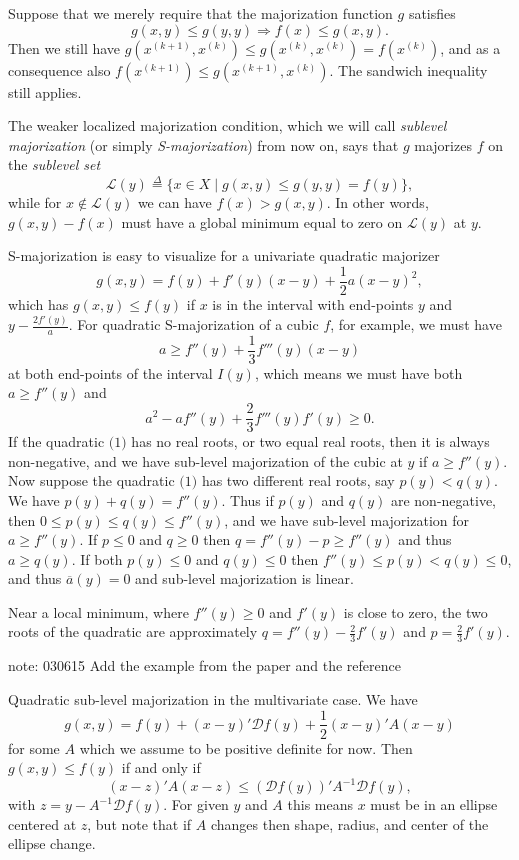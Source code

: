 \documentclass[
  12pt,
]{book}
\begin{document}
Suppose that we merely require that the majorization function \(g\) satisfies
\[
g(x,y)\leq g(y,y)\Rightarrow f(x)\leq g(x,y).
\]
Then we still have \(g(x^{(k+1)},x^{(k)})\leq g(x^{(k)},x^{(k)})=f(x^{(k)})\), and as a consequence also \(f(x^{(k+1)})\leq g(x^{(k+1)},x^{(k)})\). The sandwich inequality still applies.

The weaker localized majorization condition, which we will call \emph{sublevel majorization} (or simply \emph{S-majorization}) from now on,
says that \(g\) majorizes \(f\) on the \emph{sublevel set}
\[
\mathcal{L}(y)\mathop{=}\limits^{\Delta}\{x\in X\mid g(x,y)\leq g(y,y)=f(y)\},
\]
while for \(x\not\in\mathcal{L}(y)\) we can have \(f(x)>g(x,y)\).
In other words, \(g(x,y)-f(x)\) must have a global minimum equal to zero on \(\mathcal{L}(y)\) at \(y\).

S-majorization is easy to visualize for a univariate quadratic majorizer
\[
g(x,y)=f(y)+f'(y)(x-y)+\frac12 a(x-y)^2,
\]
which has \(g(x,y)\leq f(y)\) if \(x\) is in the interval with end-points \(y\)
and \(y-\frac{2f'(y)}{a}\). For quadratic S-majorization of a cubic \(f\), for example, we must have
\[
a\geq f''(y)+\frac13 f'''(y)(x-y)
\]
at both end-points of the interval \(I(y)\), which means we must have both \(a\geq f''(y)\) and
\[
a^2-af''(y)+\frac23 f'''(y)f'(y)\geq 0.\tag{1}
\]
If the quadratic \(\text{(1)}\) has no real roots, or two equal real roots, then it is always non-negative, and
we have sub-level majorization of the cubic at \(y\) if \(a\geq f''(y)\).
Now suppose the quadratic \(\text{(1)}\) has two different real roots, say \(p(y)<q(y)\).
We have \(p(y)+q(y)=f''(y)\). Thus if \(p(y)\) and \(q(y)\) are non-negative,
then \(0\leq p(y)\leq q(y)\leq f''(y)\), and we have sub-level majorization
for \(a\geq f''(y)\). If \(p\leq 0\) and \(q\geq 0\)
then \(q=f''(y)-p\geq f''(y)\) and thus \(a\geq q(y)\). If both \(p(y)\leq 0\)
and \(q(y)\leq 0\) then \(f''(y)\leq p(y)<q(y)\leq 0\), and thus \(\overline{a}(y)=0\) and
sub-level majorization is linear.

Near a local minimum, where \(f''(y)\geq 0\) and \(f'(y)\) is close to zero, the two roots
of the quadratic are approximately \(q=f''(y)-\frac23 f'(y)\) and \(p=\frac23 f'(y)\).

note: 030615 Add the example from the paper and the reference

Quadratic sub-level majorization in the multivariate case. We have
\[
g(x,y)=f(y)+(x-y)'\mathcal{D}f(y)+\frac12(x-y)'A(x-y)
\]
for some \(A\) which we assume to be positive definite for now.
Then \(g(x,y)\leq f(y)\) if and only if
\[
(x-z)'A(x-z)\leq (\mathcal{D}f(y))'A^{-1}\mathcal{D}f(y),
\]
with \(z=y-A^{-1}\mathcal{D}f(y)\). For given \(y\) and \(A\)
this means \(x\) must be in an ellipse centered at \(z\), but note that if \(A\) changes then shape, radius, and center of the ellipse change.
\end{document}
